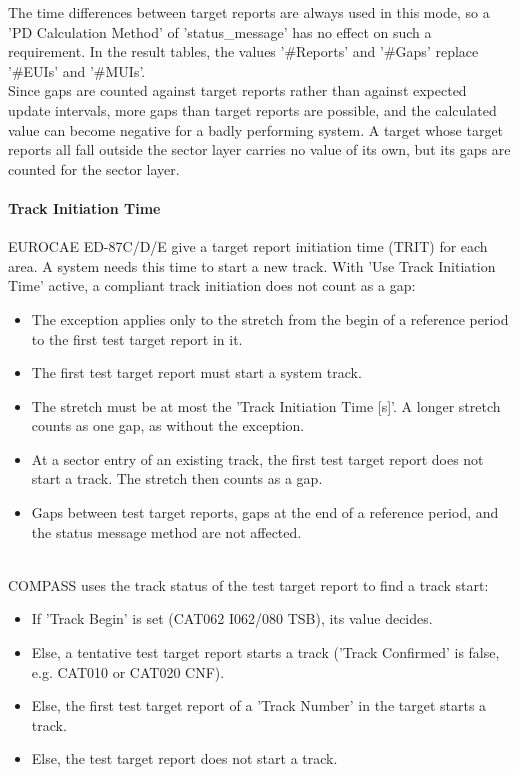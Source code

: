 The time differences between target reports are always used in this mode, so a 'PD Calculation Method' of 'status\_message' has no effect on such a requirement. In the result tables, the values '\#Reports' and '\#Gaps' replace '\#EUIs' and '\#MUIs'. \\

Since gaps are counted against target reports rather than against expected update intervals, more gaps than target reports are possible, and the calculated value can become negative for a badly performing system. A target whose target reports all fall outside the sector layer carries no value of its own, but its gaps are counted for the sector layer. \\

\paragraph{Track Initiation Time}

EUROCAE ED-87C/D/E give a target report initiation time (TRIT) for each area. A system needs this time to start a new track. With 'Use Track Initiation Time' active, a compliant track initiation does not count as a gap:

\begin{itemize}
\item The exception applies only to the stretch from the begin of a reference period to the first test target report in it.
\item The first test target report must start a system track.
\item The stretch must be at most the 'Track Initiation Time [s]'. A longer stretch counts as one gap, as without the exception.
\item At a sector entry of an existing track, the first test target report does not start a track. The stretch then counts as a gap.
\item Gaps between test target reports, gaps at the end of a reference period, and the status message method are not affected.
\end{itemize}
\ \\

COMPASS uses the track status of the test target report to find a track start:

\begin{itemize}
\item If 'Track Begin' is set (CAT062 I062/080 TSB), its value decides.
\item Else, a tentative test target report starts a track ('Track Confirmed' is false, e.g. CAT010 or CAT020 CNF).
\item Else, the first test target report of a 'Track Number' in the target starts a track.
\item Else, the test target report does not start a track.
\end{itemize}
\ \\

